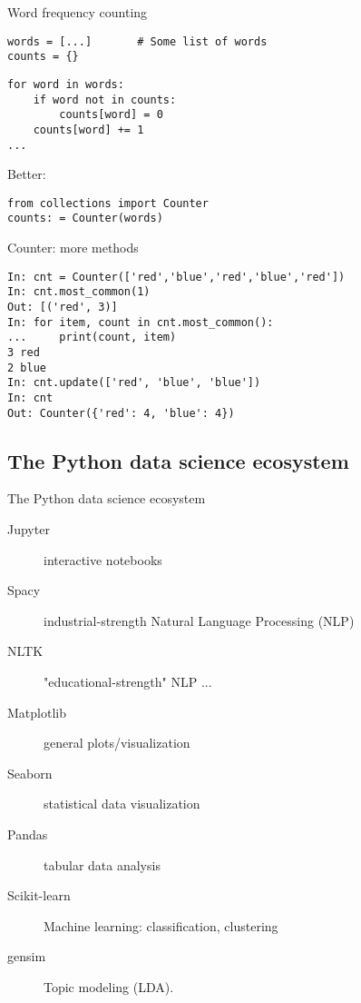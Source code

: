 \documentclass[aspectratio=169,usenames,dvipsnames]{beamer}
\begin{document}
\begin{frame}[fragile]{Word frequency counting}
\begin{lstlisting}
words = [...]       # Some list of words
counts = {}
\end{lstlisting}\pause
\begin{lstlisting}
for word in words:
    if word not in counts:
        counts[word] = 0
    counts[word] += 1
...
\end{lstlisting}
\pause
Better:
\begin{lstlisting}
from collections import Counter
counts: = Counter(words)
\end{lstlisting}
\end{frame}

\begin{frame}[fragile]{Counter: more methods}
\begin{lstlisting}
In: cnt = Counter(['red','blue','red','blue','red'])
In: cnt.most_common(1)
Out: [('red', 3)]
In: for item, count in cnt.most_common():
...     print(count, item)
3 red
2 blue
In: cnt.update(['red', 'blue', 'blue'])
In: cnt
Out: Counter({'red': 4, 'blue': 4})

\end{lstlisting}
\end{frame}


\subsection{The Python data science ecosystem}
\begin{frame}[fragile]{The Python data science ecosystem}
    \begin{description}
        \item[Jupyter] interactive notebooks
        \item[Spacy] industrial-strength Natural Language Processing (NLP)
        \item[NLTK] "educational-strength" NLP ...
        \item[Matplotlib] general plots/visualization
        \item[Seaborn] statistical data visualization
        \item[Pandas] tabular data analysis
        \item[Scikit-learn] Machine learning: classification, clustering
        \item[gensim] Topic modeling (LDA).
    \end{description}
\end{frame}
\end{document}

